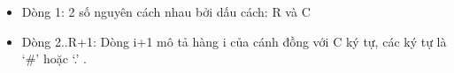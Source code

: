 \begin{itemize}
	\item     Dòng 1: 2 số nguyên cách nhau bởi dấu cách: R và C   
	\item     Dòng 2..R+1: Dòng i+1 mô tả hàng i của cánh đồng với C         ký tự, các ký tự là ‘\#’ hoặc ‘.’ .   
\end{itemize}